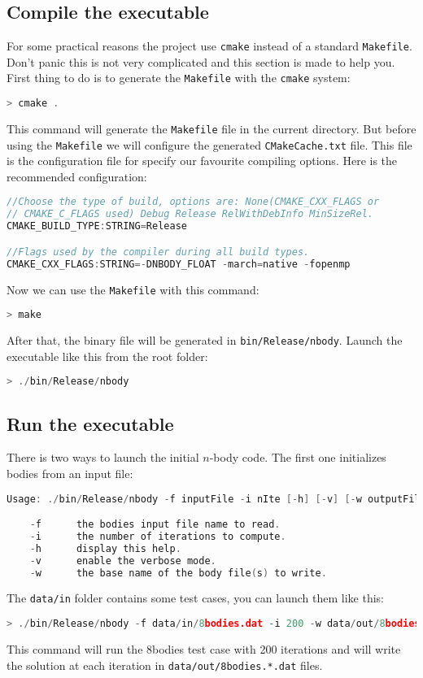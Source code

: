 \subsection{Compile the executable}

For some practical reasons the project use \texttt{cmake} instead of a standard \texttt{Makefile}.
Don't panic this is not very complicated and this section is made to help you.
First thing to do is to generate the \texttt{Makefile} with the \texttt{cmake} system:
\begin{lstlisting}[language=c]
> cmake .
\end{lstlisting}
This command will generate the \texttt{Makefile} file in the current directory.
But before using the \texttt{Makefile} we will configure the generated \texttt{CMakeCache.txt} file.
This file is the configuration file for specify our favourite compiling options.
Here is the recommended configuration:
\begin{lstlisting}[language=c]
//Choose the type of build, options are: None(CMAKE_CXX_FLAGS or
// CMAKE_C_FLAGS used) Debug Release RelWithDebInfo MinSizeRel.
CMAKE_BUILD_TYPE:STRING=Release

//Flags used by the compiler during all build types.
CMAKE_CXX_FLAGS:STRING=-DNBODY_FLOAT -march=native -fopenmp
\end{lstlisting}
Now we can use the \texttt{Makefile} with this command:
\begin{lstlisting}[language=c]
> make
\end{lstlisting}
After that, the binary file will be generated in \texttt{bin/Release/nbody}.
Launch the executable like this from the root folder:
\begin{lstlisting}[language=c]
> ./bin/Release/nbody
\end{lstlisting}

\subsection{Run the executable}

There is two ways to launch the initial $n$-body code.
The first one initializes bodies from an input file:
\begin{lstlisting}[language=c]
Usage: ./bin/Release/nbody -f inputFile -i nIte [-h] [-v] [-w outputFiles]

	-f		the bodies input file name to read.
	-i		the number of iterations to compute.
	-h		display this help.
	-v		enable the verbose mode.
	-w		the base name of the body file(s) to write.
\end{lstlisting}
The \texttt{data/in} folder contains some test cases, you can launch them like this:
\begin{lstlisting}[language=c]
> ./bin/Release/nbody -f data/in/8bodies.dat -i 200 -w data/out/8bodies
\end{lstlisting}
This command will run the 8bodies test case with 200 iterations and will write the solution at each iteration in \texttt{data/out/8bodies.*.dat} files.

